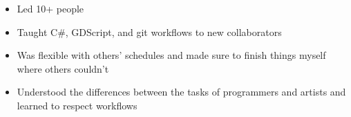 \documentclass[10pt,a4paper,ragged2e,withhyper]{altacv}
\begin{document}
\begin{paracol}{2}
		\begin{itemize}
			\item Led 10+ people
			\item Taught C\#, GDScript, and git workflows to new collaborators
			\item Was flexible with others' schedules and made sure to finish things myself where others couldn't
			\item Understood the differences between the tasks of programmers and artists and learned to respect workflows
		\end{itemize}
		
		
		
		
		\newpage
		
		\switchcolumn
		
		\CVTagCSharp
		\CVTagCPlusPlus
		\CVTagGDScript
		\CVTagHTMLCSS
		\CVTagJava \\ %
		\CVTagJSNode
		\CVTagLaTeX
		\CVTagLua
		\CVTagPython
		\CVTagRuby \\ %
		\CVTagScala
		\CVTagSQL
		\CVTagTypeScript
		
		\CVTagCodeMirrorJs
		\CVTagdatGUI %
		\CVTagExpress
		\CVTagGulp
		\CVTagPFiveJS \\ %
		\CVTagPostCSS
		\CVTagReactNative
		\CVTagReact
		\CVTagRollup
		\CVTagSCSSSass
		\CVTagSnowpack
		\CVTagSolidJS
		\CVTagStylus
		\CVTagWebpack \\ %
		\CVTagNUnit %
		\CVTagOCRA %
		\CVTagMySQL %
		\CVTagMongoDB \\ %
		\CVTagDefold %
		\CVTagGodot
		\CVTagPhaser
		\CVTagUnity
		\CVTagUE
		
		
		

\end{paracol}
\end{document}
